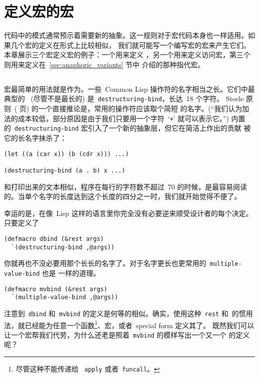 
\chapter{定义宏的宏}
\label{chap:macro-defining_macros}

代码中的模式通常预示着需要新的抽象。这一规则对于宏代码本身也一样适用。如果几个宏的定义在形式上比较相似，
我们就可能写一个编写宏的宏来产生它们。本章展示三个宏定义宏的例子：一个用来定义
\abbrev{}，另一个用来定义访问宏，第三个则用来定义在~\ref{sec:anaphoric_variants} 节中
介绍的那种指代宏。

\section{\abbrev{}}
\label{sec:abbreviations}

宏最简单的用法就是作为\abbrev{}。一些~Common Lisp 操作符的名字相当之长。它们中最典型的
~(尽管不是最长的) 是~\texttt{destructuring-bind}，长达~18 个字符。
Steele 原则~(\pageref{guy_steele_rule} 页) 的一个直接推论是，常用的操作符应该取个简短
的名字。(``我们认为加法的成本较低，部分原因是由于我们只要用一个字符~`\texttt{+}' 就可以表示它。'')
内置的~\texttt{destructuring-bind} 宏引入了一个新的抽象层，但它在简洁上作出的贡献
被它的长名字抹杀了：
\begin{lstlisting}
(let ((a (car x)) (b (cdr x))) ...)

(destructuring-bind (a . b) x ...)
\end{lstlisting}

和打印出来的文本相似，程序在每行的字符数不超过~70 的时候，是最容易阅读的。当单个名字的长度达到这个长度的四分之一时，我们就开始觉得不便了。

幸运的是，在像~Lisp 这样的语言里你完全没有必要逆来顺受设计者的每个决定。只要定义了
\begin{lstlisting}
(defmacro dbind (&rest args)
  `(destructuring-bind ,@args))
\end{lstlisting}
你就再也不没必要用那个长长的名字了。对于名字更长也更常用的~\texttt{multiple-value-bind} 也是
一样的道理。
\begin{lstlisting}
(defmacro mvbind (&rest args)
  `(multiple-value-bind ,@args))
\end{lstlisting}
注意到~\texttt{dbind} 和~\texttt{mvbind} 的定义是何等的相似。确实，使用这种~\texttt{rest}
和\commaat~的惯用法，就已经能为任意一个函数\footnote{尽管这种\abbrev{}不能传递给
~\texttt{apply} 或者~\texttt{funcall}。}、宏，或者~special form 定义其\abbrev{}了。
既然我们可以让一个宏帮我们代劳，为什么还老是照着~\texttt{mvbind} 的模样写出一个又一个
的定义呢？

